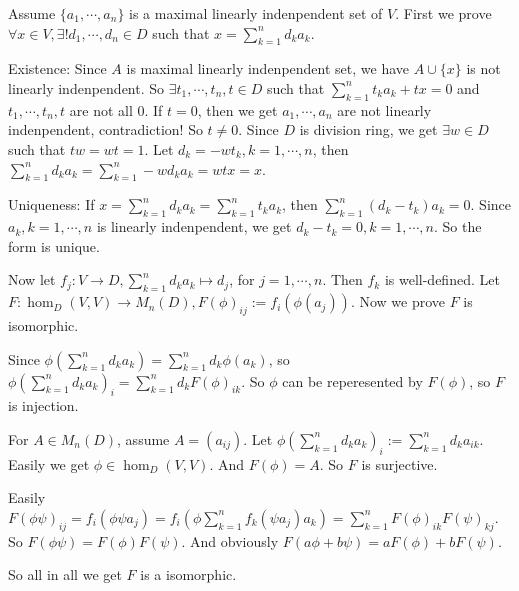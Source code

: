 \documentclass{ctexart}
\begin{document}
\begin{solution}
  Assume \(\{a_1,\cdots,a_n\} \) is a maximal linearly indenpendent set of \(V\). 
  First we prove \(\forall x \in V,\exists ! d_1,\cdots,d_n \in D\) such that \(x = \sum_{k=1}^{n} d_ka_k\). 
  
  Existence: Since \(A\) is maximal linearly indenpendent set, we have \(A \cup \{ x \}\) is not linearly indenpendent. 
  So \(\exists t_1,\cdots,t_n,t \in D\) such that \(\sum_{k=1}^{n} t_ka_k +tx =0\) and \(t_1,\cdots,t_n,t\) are not all \(0\). 
  If \(t=0\),  then we get \(a_1,\cdots,a_n\) are not linearly indenpendent, contradiction! 
  So \(t \neq 0\). Since \(D\) is division ring, we get \(\exists w \in D\) such that \(tw=wt =1\). 
  Let \(d_k=-wt_k,k=1,\cdots,n\), then \(\sum_{k=1}^{n} d_ka_k=\sum_{k=1}^{n}-wd_ka_k=wtx=x \).

  Uniqueness: If \(x=\sum_{k=1}^{n} d_ka_k=\sum_{k=1}^{n} t_k a_k\), then \(\sum_{k=1}^{n} (d_k-t_k)a_k=0\). 
  Since \(a_k,k=1,\cdots,n\) is linearly indenpendent, we get \(d_k-t_k=0,k=1,\cdots,n\). 
  So the form is unique. 

  Now let \(f_j:V \to D,\sum_{k=1}^{n} d_ka_k \mapsto d_j\), for \(j=1,\cdots,n\). Then \(f_k\) is well-defined. 
  Let \(F:\hom_D(V,V) \to M_n(D), F(\phi)_{ij}:=f_i(\phi(a_j))\). Now we prove \(F\) is isomorphic. 

  Since  \(\phi(\sum_{k=1}^{n} d_ka_k)=\sum_{k=1}^{n} d_k \phi(a_k)\), so 
  \(\phi(\sum_{k=1}^{n} d_ka_k)_i=\sum_{k=1}^{n} d_k F(\phi)_{ik}\). 
  So \(\phi\) can be reperesented by \(F(\phi)\), so \(F\) is injection. 

  For \(A \in M_n (D)\), assume \(A=(a_{ij})\). Let \(\phi(\sum_{k=1}^{n} d_ka_k)_i:=\sum_{k=1}^{n} d_ka_{ik}\). 
  Easily we get \(\phi \in \hom_D(V,V)\). And \(F(\phi)=A\). So \(F\) is surjective. 

  Easily \(F(\phi \psi)_{ij}=f_i(\phi \psi a_j)=f_i(\phi \sum_{k=1}^{n} f_k(\psi a_j)a_k)=\sum_{k=1}^{n} F(\phi)_{ik}F(\psi)_{kj}\). 
  So \(F(\phi \psi)=F(\phi) F(\psi)\). 
  And obviously \(F(a \phi+ b \psi)=aF(\phi)+b F(\psi)\). 

  So all in all we get \(F\) is a isomorphic. 
\end{solution}
\end{document}
